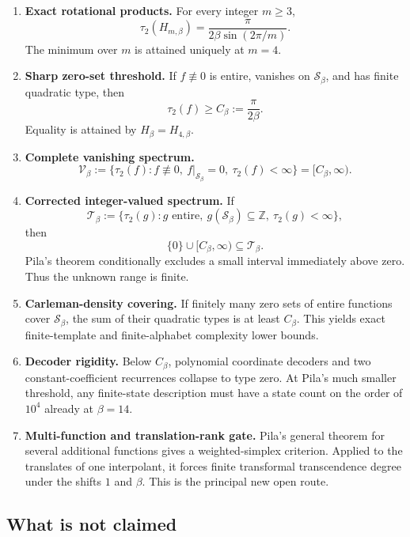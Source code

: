 \documentclass[11pt,oneside]{article}
\theoremstyle{definition}
\theoremstyle{remark}
\newcommand{\Z}{\mathbb Z}
\newcommand{\Sbeta}{\mathcal S_\beta}
\newcommand{\Tclass}{\mathcal T}
\newcommand{\Vclass}{\mathcal V}
\newcommand{\Cbeta}{C_\beta}
\begin{document}
\begin{enumerate}
\item \textbf{Exact rotational products.}  For every integer $m\ge3$,
\[
 \tau_2(H_{m,\beta})
 =\frac{\pi}{2\beta\sin(2\pi/m)}.
\]
The minimum over $m$ is attained uniquely at $m=4$.

\item \textbf{Sharp zero-set threshold.}  If $f\not\equiv0$ is entire, vanishes on
$\Sbeta$, and has finite quadratic type, then
\[
 \tau_2(f)\ge \Cbeta:=\frac{\pi}{2\beta}.
\]
Equality is attained by $H_\beta=H_{4,\beta}$.

\item \textbf{Complete vanishing spectrum.}
\[
 \Vclass_\beta
 :=\{\tau_2(f):f\not\equiv0,\ f|_{\Sbeta}=0,\ \tau_2(f)<\infty\}
 = [\Cbeta,\infty).
\]

\item \textbf{Corrected integer-valued spectrum.}  If
\[
 \Tclass_\beta
 :=\{\tau_2(g):g\text{ entire},\ g(\Sbeta)\subseteq\Z,
                       \ \tau_2(g)<\infty\},
\]
then
\[
 \{0\}\cup[\Cbeta,\infty)\subseteq\Tclass_\beta.
\]
Pila's theorem conditionally excludes a small interval immediately above zero.  Thus the
unknown range is finite.

\item \textbf{Carleman-density covering.}  If finitely many zero sets of entire functions
cover $\Sbeta$, the sum of their quadratic types is at least $\Cbeta$.  This yields exact
finite-template and finite-alphabet complexity lower bounds.

\item \textbf{Decoder rigidity.}  Below $\Cbeta$, polynomial coordinate decoders and two
constant-coefficient recurrences collapse to type zero.  At Pila's much smaller threshold,
any finite-state description must have a state count on the order of $10^4$ already at
$\beta=14$.

\item \textbf{Multi-function and translation-rank gate.}  Pila's general theorem for
several additional functions gives a weighted-simplex criterion.  Applied to the translates
of one interpolant, it forces finite transformal transcendence degree under the shifts
$1$ and $\beta$.  This is the principal new open route.
\end{enumerate}

\subsection{What is not claimed}
\end{document}
